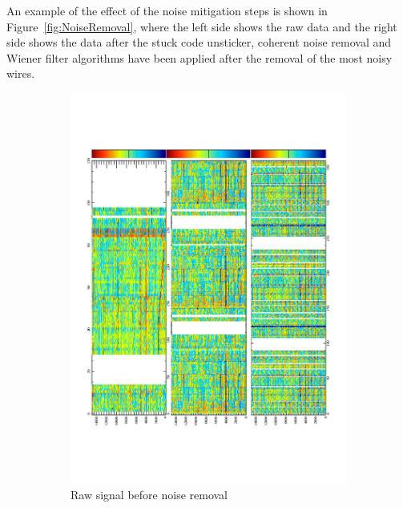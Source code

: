 An example of the effect of the noise mitigation steps is shown in Figure~\ref{fig:NoiseRemoval}, where the left side shows the raw data and the right side shows the data after the stuck code unsticker, coherent noise removal and Wiener filter algorithms have been applied after the removal of the most noisy wires. \\

\begin{figure}[h!]
  \centering
  \begin{subfigure}{0.45\textwidth}
    \centering
    \includegraphics[width=\textwidth]{Evd_BeforeNoise}
    \caption{Raw signal before noise removal}
  \end{subfigure}
  \hspace{0.08\textwidth}
  \begin{subfigure}{0.45\textwidth}
    \centering

\end{subfigure}
\end{figure}
